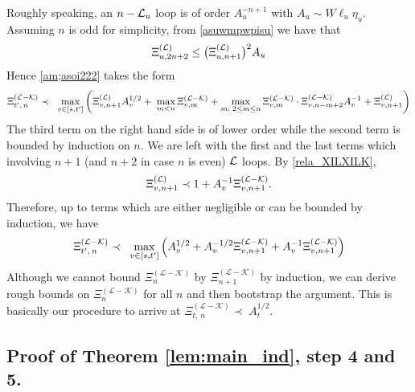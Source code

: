 \documentclass[10pt,reqno]{article}
\theoremstyle{plain} %
\theoremstyle{remark}
\numberwithin{equation}{section}
\begin{document}
 Roughly speaking,  an  $n-{\cal L}_u$ loop is of order $A_u^{-n+1}$ with $A_u \sim  W\ell_u\eta_u$. 
 Assuming $n$ is odd for simplicity,  from \eqref{asuwmpwpisu} we  have that
 \begin{equation} 
  \Xi^{({\cal L})}_{u,2n+2} 
\le \big ( \Xi^{({\cal L})}_{u,n+1} \big )^2 A_u 
\end{equation}
Hence    \eqref{am;asoi222} takes the form 
\begin{align} %
 \Xi_{t',\,n }^{(\mathcal{L}-\mathcal{K})}  \prec\;  \; \max_{v\in [s,t']}
  \left(   \Xi^{({\cal L})}_{v,n+1}  A_v^{1/2} +\; \max_{m<n }\Xi^{({\cal L-\cal K})}_{v,m}+\max_{m:\;2\le m\le n }\Xi^{({\cal L-\cal K})}_{v,m}\cdot \Xi^{({\cal L-\cal K})}_{v,n-m+2}A_v^{-1}+\Xi^{({\cal L})}_{v,n+1}\right)
 \end{align}
 The third term on the right hand side is of lower order while the second term is bounded by induction on $n$. We are left with the first and the last terms which involving  $n+1$ (and $n+2$ in case $n$ is even) $\cal L$ loops. By \eqref{rela_XILXILK}, 
 \begin{align} 
    \Xi^{(\cal L)}_{v,n+1}\prec 1+A_v^{-1} \Xi^{({\cal L-\cal K})}_{v, n+1}.
\end{align}
Therefore, up to  terms which are either negligible or can  be bounded by induction, we have 
\begin{align} %
 \Xi_{t',\,n }^{(\mathcal{L}-\mathcal{K})}  \prec\;  \; \max_{v\in [s,t']}
  \left(    A_v^{1/2} +A_v^{-1/2} \Xi^{({\cal L-\cal K})}_{v, n+1} +A_v^{-1} \Xi^{({\cal L-\cal K})}_{v, n+1}\right)
\end{align}
Although we cannot bound  $ \Xi_{n }^{(\mathcal{L}-\mathcal{K})}$ by $ \Xi_{n+1 }^{(\mathcal{L}-\mathcal{K})}$ by induction, 
we can derive rough bounds on  $ \Xi_{n }^{(\mathcal{L}-\mathcal{K})}$ for all $n$ and then bootstrap the argument. This is basically our procedure to arrive at $ \Xi_{t,\,n }^{(\mathcal{L}-\mathcal{K})}  \prec \;    A_t^{1/2}$. 




 

 
\subsection{Proof of  Theorem \ref{lem:main_ind}, step 4 and 5.}
 
\end{document}
